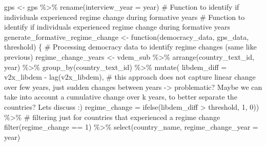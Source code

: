 \documentclass[
  letterpaper,
  DIV=11,
  numbers=noendperiod]{scrartcl}
\newenvironment{Shaded}{\begin{snugshade}}{\end{snugshade}}
\newcommand{\AttributeTok}[1]{\textcolor[rgb]{0.40,0.45,0.13}{#1}}
\newcommand{\CommentTok}[1]{\textcolor[rgb]{0.37,0.37,0.37}{#1}}
\newcommand{\ControlFlowTok}[1]{\textcolor[rgb]{0.00,0.23,0.31}{#1}}
\newcommand{\DecValTok}[1]{\textcolor[rgb]{0.68,0.00,0.00}{#1}}
\newcommand{\FunctionTok}[1]{\textcolor[rgb]{0.28,0.35,0.67}{#1}}
\newcommand{\NormalTok}[1]{\textcolor[rgb]{0.00,0.23,0.31}{#1}}
\newcommand{\OtherTok}[1]{\textcolor[rgb]{0.00,0.23,0.31}{#1}}
\newcommand{\SpecialCharTok}[1]{\textcolor[rgb]{0.37,0.37,0.37}{#1}}
\begin{document}
\begin{Shaded}
\begin{Highlighting}[]
\NormalTok{gps }\OtherTok{\textless{}{-}}\NormalTok{ gps }\SpecialCharTok{\%\textgreater{}\%}
  \FunctionTok{rename}\NormalTok{(}\AttributeTok{interview\_year =}\NormalTok{ year)}
\CommentTok{\# Function to identify if individuals experienced regime change during formative years}
\CommentTok{\# Function to identify if individuals experienced regime change during formative years}
\NormalTok{generate\_formative\_regime\_change }\OtherTok{\textless{}{-}} \ControlFlowTok{function}\NormalTok{(democracy\_data, gps\_data, threshold) \{}
  \CommentTok{\# Processing democracy data to identify regime changes (same like previous)}
\NormalTok{  regime\_change\_years }\OtherTok{\textless{}{-}}\NormalTok{ vdem\_sub }\SpecialCharTok{\%\textgreater{}\%}
    \FunctionTok{arrange}\NormalTok{(country\_text\_id, year) }\SpecialCharTok{\%\textgreater{}\%}
    \FunctionTok{group\_by}\NormalTok{(country\_text\_id) }\SpecialCharTok{\%\textgreater{}\%}
    \FunctionTok{mutate}\NormalTok{(}
      \AttributeTok{libdem\_diff =}\NormalTok{ v2x\_libdem }\SpecialCharTok{{-}} \FunctionTok{lag}\NormalTok{(v2x\_libdem), }\CommentTok{\# this approach does not capture linear change over few years, just sudden changes between years {-}\textgreater{} problematic? Maybe we can take into account a cumulative change over k years, to better separate the countries? Let\textquotesingle{}s discuss :)}
      \AttributeTok{regime\_change =} \FunctionTok{ifelse}\NormalTok{(libdem\_diff }\SpecialCharTok{\textgreater{}}\NormalTok{ threshold, }\DecValTok{1}\NormalTok{, }\DecValTok{0}\NormalTok{)) }\SpecialCharTok{\%\textgreater{}\%}
  \CommentTok{\# filtering just for countries that experienced a regime change}
    \FunctionTok{filter}\NormalTok{(regime\_change }\SpecialCharTok{==} \DecValTok{1}\NormalTok{) }\SpecialCharTok{\%\textgreater{}\%}
    \FunctionTok{select}\NormalTok{(country\_name, }\AttributeTok{regime\_change\_year =}\NormalTok{ year)}
  

\end{Highlighting}
\end{Shaded}
\end{document}
